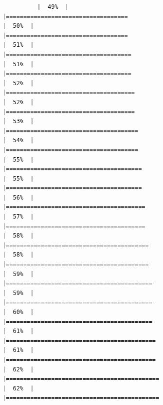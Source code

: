 \documentclass[
]{article}
\begin{document}
\begin{verbatim}
          |  49%  |                                                                              |===================================                                   |  50%  |                                                                              |===================================                                   |  51%  |                                                                              |====================================                                  |  51%  |                                                                              |====================================                                  |  52%  |                                                                              |=====================================                                 |  52%  |                                                                              |=====================================                                 |  53%  |                                                                              |======================================                                |  54%  |                                                                              |======================================                                |  55%  |                                                                              |=======================================                               |  55%  |                                                                              |=======================================                               |  56%  |                                                                              |========================================                              |  57%  |                                                                              |========================================                              |  58%  |                                                                              |=========================================                             |  58%  |                                                                              |=========================================                             |  59%  |                                                                              |==========================================                            |  59%  |                                                                              |==========================================                            |  60%  |                                                                              |==========================================                            |  61%  |                                                                              |===========================================                           |  61%  |                                                                              |===========================================                           |  62%  |                                                                              |============================================                          |  62%  |                                                                              |============================================                 
\end{verbatim}
\end{document}
